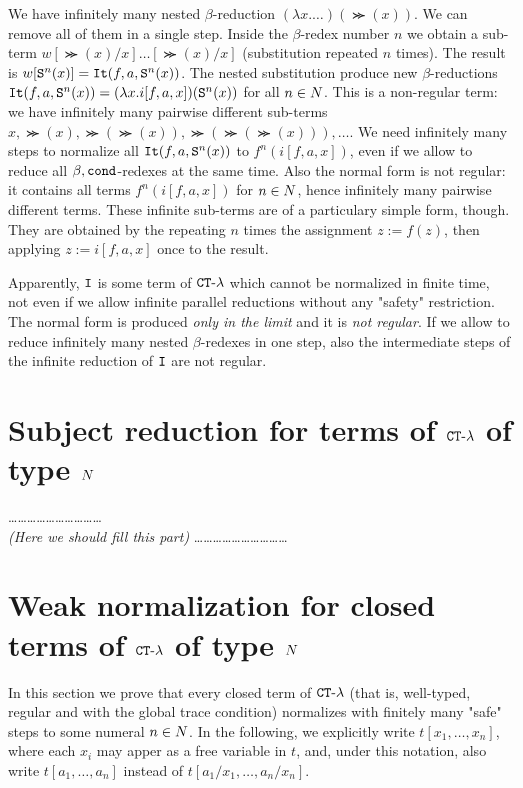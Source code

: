 \documentclass{article}
\begin{document}
We have infinitely many nested $\beta$-reduction $(\lambda x. \ldots)(\Succ (x))$.
We can remove all of them in a single step. Inside the $\beta$-redex number $n$ we obtain a sub-term
$w[\Succ (x)/x]\ldots[\Succ (x)/x]$ (substitution repeated $n$ times).
The result is $w[{\tt S} ^n(x)] = {\tt It}(f,a,{\tt S} ^n(x))$.
The nested substitution produce new $\beta$-reductions 
${\tt It}(f,a,{\tt S} ^n(x)) = (\lambda x.i[f,a,x])({\tt S} ^n(x))$ for all $n \in {N}$.
This is a non-regular term: we have infinitely many pairwise different 
sub-terms $x,\Succ (x),\Succ (\Succ (x)), \Succ (\Succ (\Succ (x))), \ldots$.
We need infinitely many steps to normalize all ${\tt It}(f,a,{\tt S} ^n(x))$ to $f^n(i[f,a,x])$, 
even if we allow to reduce all $\beta,{\tt cond}$-redexes at the same time.
Also the normal form is not regular: it contains all terms $f^n(i[f,a,x])$ for $n \in {N}$, hence
infinitely many pairwise different terms. These infinite sub-terms are of a particulary simple form, though. 
They are obtained by the repeating $n$ times the assignment $z:=f(z)$, then applying $z:=i[f,a,x]$ once
to the result.

Apparently, ${\tt I}$ 
is some term of ${ {\tt CT} \mbox{-} \lambda}$ which cannot be normalized in finite time, not even if we allow
infinite parallel reductions without any "safety" restriction. The normal form is produced \emph{only in the limit}
and it is \emph{not regular}. If we allow to reduce infinitely many nested $\beta$-redexes in one step, also
the intermediate steps of the infinite reduction of ${\tt I}$ are not regular.


\section{Subject reduction for terms of ${ {\tt CT} \mbox{-} \lambda}$ of type ${N}$}
\ldots\ldots\ldots\ldots\ldots\ldots\ldots\ldots\ldots\ldots
\\
\emph{(Here we should fill this part)}
\ldots\ldots\ldots\ldots\ldots\ldots\ldots\ldots\ldots\ldots
{}


\section{Weak normalization for closed terms of ${ {\tt CT} \mbox{-} \lambda}$ of type ${N}$}
\label{section-weak-normalization}
In this section we prove that every closed term of ${ {\tt CT} \mbox{-} \lambda}$
 (that is, well-typed, regular and with the global trace condition) normalizes with finitely many "safe" steps
to some numeral $n \in {N}$.
In the following, we explicitly write $t[x_1,\ldots,x_n]$,
where each $x_i$ may apper as a free variable in $t$, 
and, under this notation, also write $t[a_1,\ldots,a_n]$ instead of $t[a_1/x_1,\ldots,a_n/x_n]$. 
\end{document}
